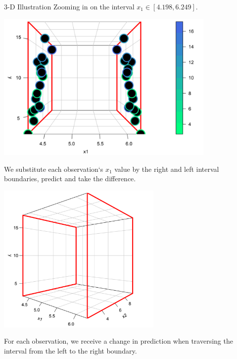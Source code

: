 \begin{vbframe}{3-D Illustration}
Zooming in on the interval $x_1 \in [4.198, 6.249]$.

\framebreak


\begin{center}
\includegraphics[width=0.8\textwidth]{figure_man/3D03.png}
\end{center}


We substitute each observation`s $x_1$ value by the right and left interval boundaries, predict and take the difference.

\framebreak

\begin{center}
\includegraphics[width=0.6\textwidth]{figure_man/3D04.png}
\end{center}

For each observation, we receive a change in prediction when traversing the interval from the left to the right boundary.

\end{vbframe}

